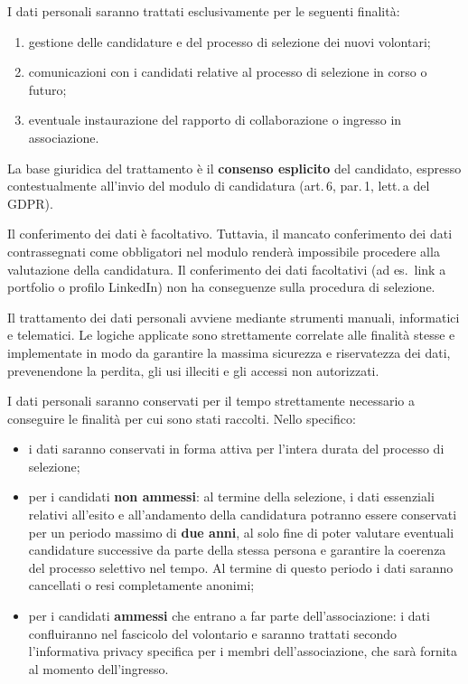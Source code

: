\documentclass[legal]{core/polinetwork}
\begin{document}

I dati personali saranno trattati esclusivamente per le seguenti finalità:

\begin{enumerate}
  \item gestione delle candidature e del processo di selezione dei nuovi
    volontari;
  \item comunicazioni con i candidati relative al processo di selezione in
    corso o futuro;
  \item eventuale instaurazione del rapporto di collaborazione o ingresso
    in associazione.
\end{enumerate}

La base giuridica del trattamento è il \textbf{consenso esplicito} del
candidato, espresso contestualmente all'invio del modulo di candidatura
(art.\,6, par.\,1, lett.\,a del GDPR).

Il conferimento dei dati è facoltativo. Tuttavia, il mancato conferimento
dei dati contrassegnati come obbligatori nel modulo renderà impossibile
procedere alla valutazione della candidatura. Il conferimento dei dati
facoltativi (ad es.\ link a portfolio o profilo LinkedIn) non ha
conseguenze sulla procedura di selezione.


Il trattamento dei dati personali avviene mediante strumenti manuali,
informatici e telematici. Le logiche applicate sono strettamente correlate
alle finalità stesse e implementate in modo da garantire la massima
sicurezza e riservatezza dei dati, prevenendone la perdita, gli usi
illeciti e gli accessi non autorizzati.


I dati personali saranno conservati per il tempo strettamente necessario a
conseguire le finalità per cui sono stati raccolti. Nello specifico:

\begin{itemize}
  \item i dati saranno conservati in forma attiva per l'intera durata del
    processo di selezione;
  \item per i candidati \textbf{non ammessi}: al termine della selezione,
    i dati essenziali relativi all'esito e all'andamento della candidatura
    potranno essere conservati per un periodo massimo di \textbf{due anni},
    al solo fine di poter valutare eventuali candidature successive da
    parte della stessa persona e garantire la coerenza del processo
    selettivo nel tempo. Al termine di questo periodo i dati saranno
    cancellati o resi completamente anonimi;
  \item per i candidati \textbf{ammessi} che entrano a far parte
    dell'associazione: i dati confluiranno nel fascicolo del volontario e
    saranno trattati secondo l'informativa privacy specifica per i membri
    dell'associazione, che sarà fornita al momento dell'ingresso.
\end{itemize}
\end{document}
